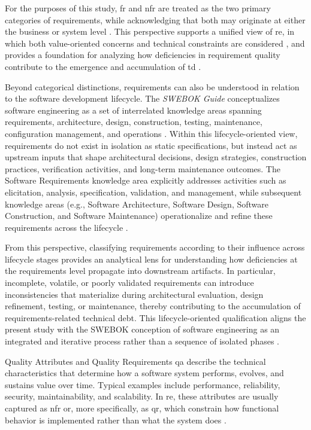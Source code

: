 \documentclass[12pt,reqno, twoside]{amsbook}
\makeatletter
\def\subsection{\@startsection{subsection}{2}%
      \z@{.5\linespacing\@plus.7\linespacing}{.25\linespacing}%
      {\normalfont\bfseries\flushleft}}
\theoremstyle{plain}
\numberwithin{equation}{chapter}
\numberwithin{section}{chapter}
\makeatother
\begin{document}
For the purposes of this study, \gls{fr} and \gls{nfr} are treated as the two primary categories of requirements, 
while acknowledging that both may originate at either the business or system level \parencite{Behutiye2019}. This 
perspective supports a unified view of \gls{re}, in which both value-oriented concerns and technical constraints are 
considered \parencite{Femmer2019}, and provides a foundation for analyzing how deficiencies in requirement quality 
contribute to the emergence and accumulation of \gls{td} \parencite{Rios2019, Melo2022}.

Beyond categorical distinctions, requirements can also be understood in relation to the 
software development lifecycle. The \textit{SWEBOK Guide} conceptualizes software engineering 
as a set of interrelated knowledge areas spanning requirements, architecture, design, 
construction, testing, maintenance, configuration management, and operations 
\parencite{SWEBOK2024}. Within this lifecycle-oriented view, requirements do not exist in isolation 
as static specifications, but instead act as upstream inputs that shape architectural decisions, 
design strategies, construction practices, verification activities, and long-term maintenance 
outcomes. The Software Requirements knowledge area explicitly addresses activities such as 
elicitation, analysis, specification, validation, and management, while subsequent knowledge 
areas (e.g., Software Architecture, Software Design, Software Construction, and Software 
Maintenance) operationalize and refine these requirements across the lifecycle 
\parencite{SWEBOK2024}. 

From this perspective, classifying requirements according to their influence across lifecycle 
stages provides an analytical lens for understanding how deficiencies at the requirements 
level propagate into downstream artifacts. In particular, incomplete, volatile, or poorly 
validated requirements can introduce inconsistencies that materialize during architectural 
evaluation, design refinement, testing, or maintenance, thereby contributing to the 
accumulation of requirements-related technical debt. This lifecycle-oriented qualification 
aligns the present study with the SWEBOK conception of software engineering as an 
integrated and iterative process rather than a sequence of isolated phases \parencite{SWEBOK2024}.

\subsection{Quality Attributes and Quality Requirements}
\noindent \gls{qa} describe the technical characteristics that determine how a software system 
performs, evolves, and sustains value over time. Typical examples include performance, 
reliability, security, maintainability, and scalability. In \gls{re}, these attributes are usually 
captured as \gls{nfr} or, more specifically, as \gls{qr}, which constrain how functional behavior 
is implemented rather than what the system does \parencite{Behutiye2019, Behutiye2022}.
\end{document}
